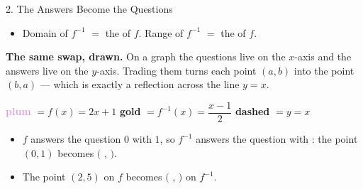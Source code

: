 \documentclass[10pt]{article}
\begin{document}
\begin{notesbox}{2. The Answers Become the Questions}
\smallskip
\begin{itemize}[itemsep=4pt]
  \item Domain of $f^{-1}$ $=$ the  of $f$. \quad
        Range of $f^{-1}$ $=$ the  of $f$.
\end{itemize}

\medskip
\textbf{The same swap, drawn.} On a graph the questions live on the $x$-axis
and the answers live on the $y$-axis. Trading them turns each point $(a,b)$
into the point $(b,a)$ --- which is exactly a reflection across the line
$y = x$.

\smallskip
\begin{center}
\end{center}
{\small\textcolor{plum}{\textbf{plum}} $= f(x) = 2x + 1$ \qquad
 \textcolor{goldacc}{\textbf{gold}} $= f^{-1}(x) = \dfrac{x-1}{2}$ \qquad
 \textcolor{slate}{\textbf{dashed}} $= y = x$}

\smallskip
\begin{itemize}[itemsep=4pt]
  \item $f$ answers the question $0$ with $1$, so $f^{-1}$ answers the question
         with : the point $(0,1)$ becomes
        $($  ,  $)$.
  \item The point $(2, 5)$ on $f$ becomes $($  ,
         $)$ on $f^{-1}$.
\end{itemize}
\end{notesbox}

\vspace{0.1in}
\end{document}
